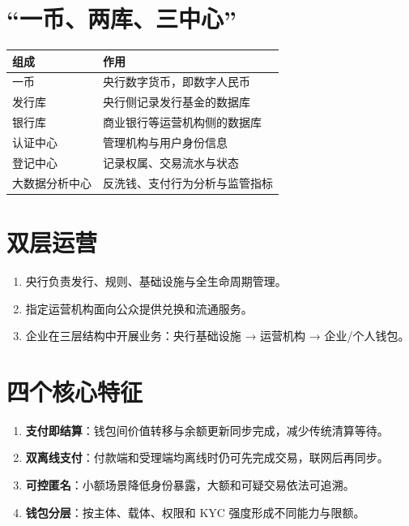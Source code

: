 \section{``一币、两库、三中心''}\label{ux4e00ux5e01ux4e24ux5e93ux4e09ux4e2dux5fc3}

{\def\LTcaptype{none} %
\begin{longtable}[]{@{}ll@{}}
\toprule\noalign{}
组成 & 作用 \\
\midrule\noalign{}
\endhead
\bottomrule\noalign{}
\endlastfoot
一币 & 央行数字货币，即数字人民币 \\
发行库 & 央行侧记录发行基金的数据库 \\
银行库 & 商业银行等运营机构侧的数据库 \\
认证中心 & 管理机构与用户身份信息 \\
登记中心 & 记录权属、交易流水与状态 \\
大数据分析中心 & 反洗钱、支付行为分析与监管指标 \\
\end{longtable}
}

\section{双层运营}\label{ux53ccux5c42ux8fd0ux8425}

\begin{enumerate}
\def\labelenumi{\arabic{enumi}.}
\tightlist
\item
  央行负责发行、规则、基础设施与全生命周期管理。
\item
  指定运营机构面向公众提供兑换和流通服务。
\item
  企业在三层结构中开展业务：央行基础设施 → 运营机构 → 企业/个人钱包。
\end{enumerate}

\section{四个核心特征}\label{ux56dbux4e2aux6838ux5fc3ux7279ux5f81}

\begin{enumerate}
\def\labelenumi{\arabic{enumi}.}
\tightlist
\item
  \textbf{支付即结算}：钱包间价值转移与余额更新同步完成，减少传统清算等待。
\item
  \textbf{双离线支付}：付款端和受理端均离线时仍可先完成交易，联网后再同步。
\item
  \textbf{可控匿名}：小额场景降低身份暴露，大额和可疑交易依法可追溯。
\item
  \textbf{钱包分层}：按主体、载体、权限和 KYC 强度形成不同能力与限额。
\end{enumerate}


